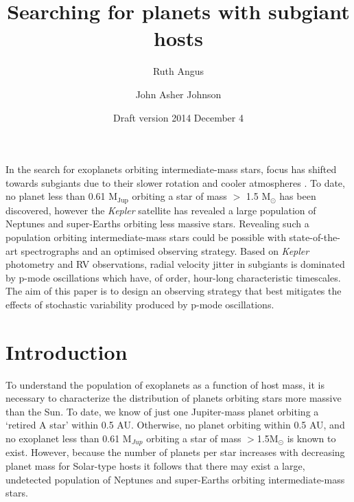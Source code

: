 \documentclass[useAMS, usenatbib]{aastex}
\title{Searching for planets with subgiant hosts}
\author{Ruth Angus}
\affil{Department of Physics, University of Oxford, UK}
\author{John Asher Johnson}
\affil{Harvard-Smithsonian Center for Astrophysics, Cambridge,
MA, USA}
\begin{document}
\date{Draft version 2014 December 4}
\maketitle


In the search for exoplanets orbiting intermediate-mass stars, focus has
shifted towards subgiants due to their slower rotation and cooler atmospheres
\citep{Johnson2014}.
To date, no planet less than 0.61 M$_{\mathrm{Jup}}$ orbiting a star of mass
$>$ 1.5 M$_\odot$ has been discovered, however the {\it Kepler} satellite has
revealed a large population of Neptunes and super-Earths orbiting less massive
stars.
Revealing such a population orbiting intermediate-mass stars could be possible
with state-of-the-art spectrographs and an optimised observing strategy.
Based on {\it Kepler} photometry and RV observations, radial velocity jitter
in subgiants is dominated by p-mode oscillations which have, of order,
hour-long characteristic timescales.
The aim of this paper is to design an observing strategy that best mitigates
the effects of stochastic variability produced by p-mode oscillations.


\section{Introduction}
\label{intro}

To understand the population of exoplanets as a function of host mass, it is
necessary to characterize the distribution of planets orbiting stars more
massive than the Sun.
To date, we know of just one Jupiter-mass planet orbiting a `retired A star'
within 0.5 AU.
Otherwise, no planet orbiting within 0.5 AU, and no exoplanet less than 0.61
M$_{Jup}$ orbiting a star of mass $>$1.5M$_{\odot}$ is known to exist.
However, because the number of planets per star increases with decreasing
planet mass for Solar-type hosts it follows that there may exist a large,
undetected population of Neptunes and super-Earths orbiting intermediate-mass
stars.
\end{document}
